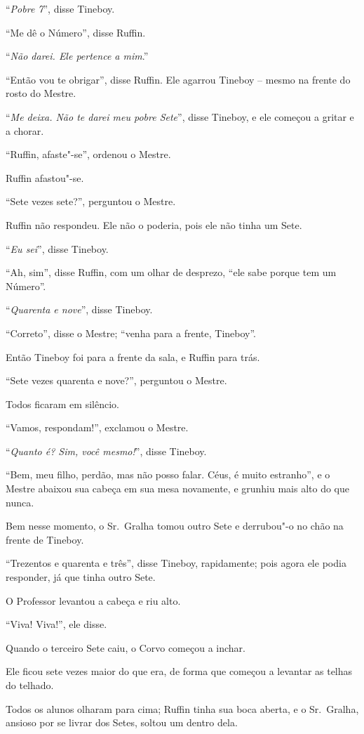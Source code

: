 ``\emph{Pobre 7}'', disse Tineboy.

``Me dê o Número'', disse Ruffin.

``\emph{Não darei. Ele pertence a mim}.''

``Então vou te obrigar'', disse Ruffin. Ele agarrou Tineboy -- mesmo na
frente do rosto do Mestre.

``\emph{Me deixa. Não te darei meu pobre Sete}'', disse Tineboy, e ele
começou a gritar e a chorar.

``Ruffin, afaste"-se'', ordenou o Mestre.

Ruffin afastou"-se.

``Sete vezes sete?'', perguntou o Mestre.

Ruffin não respondeu. Ele não o poderia, pois ele não tinha um Sete.

``\emph{Eu sei}'', disse Tineboy.

``Ah, sim'', disse Ruffin, com um olhar de desprezo, ``ele sabe porque
tem um Número''.

``\emph{Quarenta e nove}'', disse Tineboy.

``Correto'', disse o Mestre; ``venha para a frente, Tineboy''.

Então Tineboy foi para a frente da sala, e Ruffin para trás.

``Sete vezes quarenta e nove?'', perguntou o Mestre.

Todos ficaram em silêncio.

``Vamos, respondam!'', exclamou o Mestre.

``\emph{Quanto é? Sim, você mesmo!}'', disse Tineboy.

``Bem, meu filho, perdão, mas não posso falar. Céus, é muito estranho'',
e o Mestre abaixou sua cabeça em sua mesa novamente, e grunhiu mais alto
do que nunca.

Bem nesse momento, o Sr.~Gralha tomou outro Sete e derrubou"-o no chão na
frente de Tineboy.

``Trezentos e quarenta e três'', disse Tineboy, rapidamente; pois agora
ele podia responder, já que tinha outro Sete.

O Professor levantou a cabeça e riu alto.

``Viva! Viva!'', ele disse.

Quando o terceiro Sete caiu, o Corvo começou a inchar.

Ele ficou sete vezes maior do que era, de forma que começou a levantar
as telhas do telhado.

Todos os alunos olharam para cima; Ruffin tinha sua boca aberta, e o Sr.~Gralha, ansioso por se livrar dos Setes, soltou um dentro dela.

